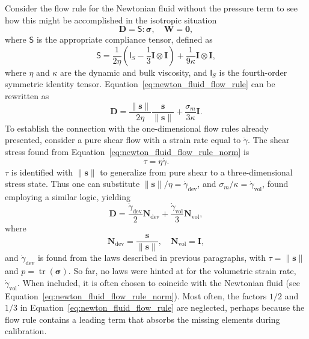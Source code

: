 Consider the flow rule for the Newtonian fluid without the pressure term to see how this might be accomplished in the isotropic situation
\begin{equation}
	\label{eq:newton_fluid_flow_rule}
	\mathbf D = \bm{\mathsf S}: \bm \sigma,\quad \mathbf W = \bm 0,
\end{equation}
where $\bm{\mathsf S}$ is the appropriate compliance tensor, defined as
\begin{equation}
	\bm{\mathsf S} = \frac{1}{2\eta} \left(\bm{\mathsf I}_S - \frac{1}{3} \mathbf I\otimes\mathbf I\right) + \frac{1}{9\kappa} \mathbf I\otimes \mathbf I,
\end{equation}
where $\eta$ and $\kappa$ are the dynamic and bulk viscosity, and $\bm{\mathsf I}_S$ is the fourth-order symmetric identity tensor.
Equation~\eqref{eq:newton_fluid_flow_rule} can be rewritten as
\begin{equation}
	\label{eq:newton_fluid_flow_rule_norm}
	\mathbf D = \frac{\|\mathbf s\|}{2 \eta} \frac{\mathbf s}{\|\mathbf s\|} + \frac{\sigma_m}{3\kappa} \mathbf I.
\end{equation}
To establish the connection with the one-dimensional flow rules already presented, consider a pure shear flow with a strain rate equal to $\dot \gamma$.
The shear stress found from Equation~\eqref{eq:newton_fluid_flow_rule_norm} is
\begin{equation}
	\tau = \eta \dot\gamma.
\end{equation}
$\tau$ is identified with $\|\mathbf s\|$ to generalize from pure shear to a three-dimensional stress state.
Thus one can substitute $\|\mathbf s\|/\eta = \dot\gamma_\text{dev}$, and $\sigma_m /\kappa = \dot\gamma_\text{vol}$, found employing a similar logic, yielding
\begin{equation}
	\mathbf D = \frac{\dot \gamma_\text{dev} }{2} \mathbf N_\text{dev} + \frac{\dot\gamma_\text{vol} }{3} \mathbf N_\text{vol},
\end{equation}
where
\begin{equation}
	\label{eq:flow_rule_directions}
	\mathbf N_\text{dev} = \frac{\mathbf s}{\|\mathbf s\|},\quad \mathbf N_\text{vol} = \mathbf I,
\end{equation}
and $\dot \gamma_\text{dev}$ is found from the laws described in previous paragraphs, with $\tau=\|\mathbf s\|$ and $p = \operatorname{tr}(\bm \sigma)$.
So far, no laws were hinted at for the volumetric strain rate, $\dot \gamma_\text{vol}$.
When included, it is often chosen to coincide with the Newtonian fluid (see Equation~\eqref{eq:newton_fluid_flow_rule_norm}).
Most often, the factors $1/2$ and $1/3$ in Equation~\eqref{eq:newton_fluid_flow_rule} are neglected, perhaps because the flow rule contains a leading term that absorbs the missing elements during calibration.

